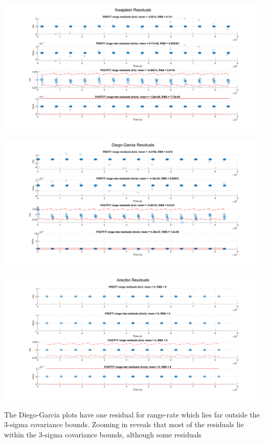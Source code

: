 \documentclass[conf]{new-aiaa}
\begin{document}
\begin{center}
	
\includegraphics[width=\textwidth]{KJL_res_all.png}

\includegraphics[width=\textwidth]{DGO_res_all.png}

\includegraphics[width=\textwidth]{ACB_res_all.png}

\end{center}

The Diego-Garcia plots have one residual for range-rate which lies far outside the 3-sigma covariance bounds. Zooming in reveals that most of the residuals lie within the 3-sigma covariance bounds, although some residuals 
\end{document}
